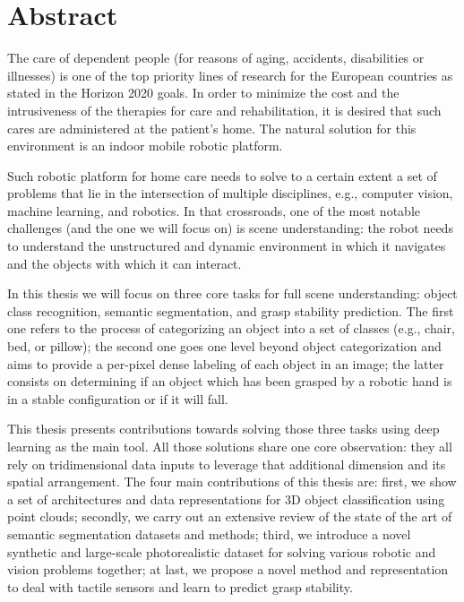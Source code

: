 \chapter{Abstract}

The care of dependent people (for reasons of aging, accidents, disabilities or illnesses) is one of the top priority lines of research for the European countries as stated in the Horizon 2020 goals. In order to minimize the cost and the intrusiveness of the therapies for care and rehabilitation, it is desired that such cares are administered at the patient's home. The natural solution for this environment is an indoor mobile robotic platform.

Such robotic platform for home care needs to solve to a certain extent a set of problems that lie in the intersection of multiple disciplines, e.g., computer vision, machine learning, and robotics. In that crossroads, one of the most notable challenges (and the one we will focus on) is scene understanding: the robot needs to understand the unstructured and dynamic environment in which it navigates and the objects with which it can interact.

In this thesis we will focus on three core tasks for full scene understanding: object class recognition, semantic segmentation, and grasp stability prediction. The first one refers to the process of categorizing an object into a set of classes (e.g., chair, bed, or pillow); the second one goes one level beyond object categorization and aims to provide a per-pixel dense labeling of each object in an image; the latter consists on determining if an object which has been grasped by a robotic hand is in a stable configuration or if it will fall.

This thesis presents contributions towards solving those three tasks using deep learning as the main tool. All those solutions share one core observation: they all rely on tridimensional data inputs to leverage that additional dimension and its spatial arrangement. The four main contributions of this thesis are: first, we show a set of architectures and data representations for 3D object classification using point clouds; secondly, we carry out an extensive review of the state of the art of semantic segmentation datasets and methods; third, we introduce a novel synthetic and large-scale photorealistic dataset for solving various robotic and vision problems together; at last, we propose a novel method and representation to deal with tactile sensors and learn to predict grasp stability.

